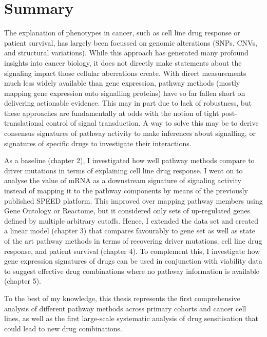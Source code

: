\chapter*{Summary}
The explanation of phenotypes in cancer, such as cell line drug response or
    patient survival, has largely been focussed on genomic alterations (SNPs,
    CNVs, and structural variations). While this approach has generated many
    profound insights into cancer biology, it does not directly make statements
    about the signaling impact those cellular aberrations create. With direct
    measurements much less widely available than gene expression, pathway
    methods (mostly mapping gene expression onto signalling proteins) have so
    far fallen short on delivering actionable evidence. This may in part due to
    lack of robustness, but these approaches are fundamentally at odds with the
    notion of tight post-translational control of signal transduction. A way to
    solve this may be to derive consensus signatures of pathway activity to
    make inferences about signalling, or signatures of specific drugs to
    investigate their interactions.

As a baseline (chapter 2), I investigated how well pathway methods compare to
    driver mutations in terms of explaining cell line drug response. I went on
    to analyse the value of mRNA as a downstream signature of signaling
    activity instead of mapping it to the pathway components by means of the
    previously published SPEED platform. This improved over mapping pathway
    members using Gene Ontology or Reactome, but it considered only sets of
    up-regulated genes defined by multiple arbitrary cutoffs. Hence, I extended
    the data set and created a linear model (chapter 3) that compares
    favourably to gene set as well as state of the art pathway methods in terms
    of recovering driver mutations, cell line drug response, and patient
    survival (chapter 4). To complement this, I investigate how gene expression
    signatures of drugs can be used in conjunction with viability data to
    suggest effective drug combinations where no pathway information is
    available (chapter 5).

To the best of my knowledge, this thesis represents the first comprehensive
    analysis of different pathway methods across primary cohorts and cancer
    cell lines, as well as the first large-scale systematic analysis of drug
    sensitisation that could lead to new drug combinations.

